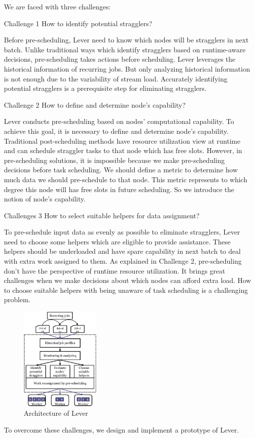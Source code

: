 \documentclass[10pt,conference,compsocconf,letterpaper]{IEEEtran}
\begin{document}
  We are faced with three challenges:

  Challenge 1 How to identify potential stragglers?

  Before pre-scheduling, Lever need to know which nodes will be stragglers in next batch. Unlike traditional ways which identify stragglers based on runtime-aware decisions, pre-scheduling takes actions before scheduling. Lever leverages the historical information of recurring jobs. But only analyzing historical information is not enough due to the variability of stream load. Accurately identifying potential stragglers is a prerequisite step for eliminating stragglers.

  Challenge 2 How to define and determine node's capability?

  Lever conducts pre-scheduling based on nodes' computational capability. To achieve this goal, it is necessary to define and determine node's capability. Traditional post-scheduling methods have resource utilization view at runtime and can schedule straggler tasks to that node which has free slots. However, in pre-scheduling solutions, it is impossible because we make pre-scheduling decisions before task scheduling. We should define a metric to determine how much data we should pre-schedule to that node. This metric represents to which degree this node will has free slots in future scheduling. So we introduce the notion of node's capability.

  Challenges 3 How to select suitable helpers for data assignment?

  To pre-schedule input data as evenly as possible to eliminate stragglers, Lever need to choose some helpers which are eligible to provide assistance. These helpers should be underloaded and have spare capability in next batch to deal with extra work assigned to them. As explained in Challenge 2, pre-scheduling don't have the perspective of runtime resource utilization. It brings great challenges when we make decisions about which nodes can afford extra load. How to choose suitable helpers with being unaware of task scheduling is a challenging problem.

  \begin{figure}[htbp]
    \centering
    \includegraphics[width=0.35\textwidth]{FigureArchitecture}
    \caption{Architecture of Lever}
    \label{Fig. 4:}
  \end{figure}
  To overcome these challenges, we design and implement a prototype of Lever.
\end{document}
